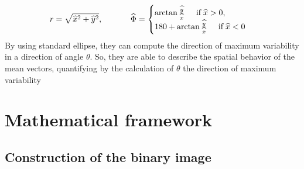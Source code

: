 \documentclass[12pt]{article}
\renewcommand{\hat}{\widehat}
\theoremstyle{Theorem}
\begin{document}
\begin{equation*}
r=\sqrt{\hat{x}^{2} + \hat{y}^{2}}, \; \hspace{1cm} \; \hat{\Phi} = \begin{cases} \arctan{\frac{\hat{y}}{\hat{x}}} \hspace{0.5cm} \text{if} \; \hat{x} > 0 , \\
180 + \arctan{\frac{\hat{y}}{\hat{x}}} \hspace{0.5cm} \text{if} \; \hat{x} < 0 
\end{cases}
\end{equation*}
By using standard ellipse, they can compute the direction of maximum variability in a direction of angle $\theta$. So, they are able to describe the spatial behavior of the mean vectors, quantifying by the calculation of $\theta$ the direction of maximum variability

\section{Mathematical framework}\label{section1}
\subsection{Construction of the binary image}\label{construction}
\end{document}
